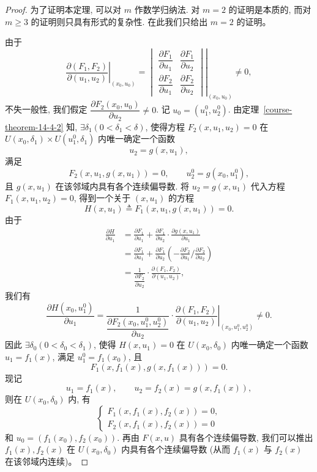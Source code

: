 \documentclass[UTF8,12pt,a4paper,fontset=fandol]{ctexart}
\begin{document}
\begin{proof}\quad 为了证明本定理, 可以对 $m$ 作数学归纳法. 对 $m=2$ 的证明是本质的, 而对 $m\geqslant3$ 的证明则只具有形式的复杂性. 在此我们只给出 $m=2$ 的证明。

由于
\[
  \left.
  \frac{\partial(F_1,F_2)}{\partial(u_1,u_2)}
  \right|_{(x_0,u_0)}
  =
  \left.
  \begin{vmatrix}
    \dfrac{\partial F_1}{\partial u_1} &
    \dfrac{\partial F_1}{\partial u_2}\\
    \dfrac{\partial F_2}{\partial u_1} &
    \dfrac{\partial F_2}{\partial u_2}
  \end{vmatrix}
  \right|_{(x_0,u_0)}
  \ne0,
\]
不失一般性, 我们假定 $\dfrac{\partial F_2(x_0,u_0)}{\partial u_2}\ne0$. 记 $u_0=(u_1^0,u_2^0)$. 由定理~\ref{course-theorem-14-4-2}  知, $\exists\delta_1(0<\delta_1<\delta)$, 使得方程 $F_2(x,u_1,u_2)=0$ 在 $U(x_0,\delta_1)\times U(u_1^0,\delta_1)$ 内唯一确定一个函数
\[
  u_2=g(x,u_1),
\]
满足
\[
  F_2(x,u_1,g(x,u_1))=0,\qquad u_2^0=g(x_0,u_1^0),
\]
且 $g(x,u_1)$ 在该邻域内具有各个连续偏导数. 将 $u_2=g(x,u_1)$ 代入方程 $F_1(x,u_1,u_2)=0$, 得到一个关于 $(x,u_1)$ 的方程
\[
  H(x,u_1)\triangleq F_1(x,u_1,g(x,u_1))=0.
\]
由于
\[
\begin{aligned}
  \frac{\partial H}{\partial u_1}
  &=\frac{\partial F_1}{\partial u_1}
  +\frac{\partial F_1}{\partial u_2}\cdot
  \frac{\partial g(x,u_1)}{\partial u_1}\\
  &=\frac{\partial F_1}{\partial u_1}
  +\frac{\partial F_1}{\partial u_2}
  \left(-\frac{\partial F_2}{\partial u_1}\bigg/
  \frac{\partial F_2}{\partial u_2}\right)\\
  &=\frac1{\dfrac{\partial F_2}{\partial u_2}}\cdot
  \frac{\partial(F_1,F_2)}{\partial(u_1,u_2)},
\end{aligned}
\]
我们有
\[
  \frac{\partial H(x_0,u_1^0)}{\partial u_1}
  =\frac1{\dfrac{\partial F_2(x_0,u_1^0,u_2^0)}{\partial u_2}}\cdot
  \left.
  \frac{\partial(F_1,F_2)}{\partial(u_1,u_2)}
  \right|_{(x_0,u_1^0,u_2^0)}
  \ne0.
\]
因此 $\exists\delta_0(0<\delta_0<\delta_1)$, 使得 $H(x,u_1)=0$ 在 $U(x_0,\delta_0)$ 内唯一确定一个函数 $u_1=f_1(x)$, 满足 $u_1^0=f_1(x_0)$, 且
\[
  F_1(x,f_1(x),g(x,f_1(x)))=0.
\]
现记
\[
  u_1=f_1(x),\qquad u_2=f_2(x)=g(x,f_1(x)),
\]
则在 $U(x_0,\delta_0)$ 内, 有
\[
  \begin{cases}
    F_1(x,f_1(x),f_2(x))=0,\\
    F_2(x,f_1(x),f_2(x))=0
  \end{cases}
\]
和 $u_0=(f_1(x_0),f_2(x_0))$. 再由 $F(x,u)$ 具有各个连续偏导数, 我们可以推出 $f_1(x),f_2(x)$ 在 $U(x_0,\delta_0)$ 内具有各个连续偏导数 (从而 $f_1(x)$ 与 $f_2(x)$ 在该邻域内连续)。


\end{proof}
\end{document}
